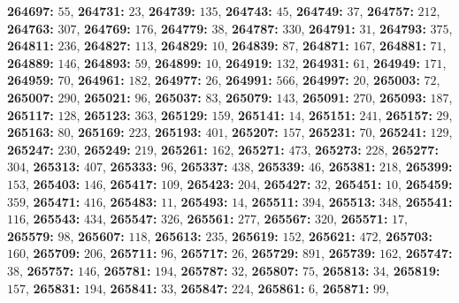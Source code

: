 \textsf{\bfseries 264697:} $55$, \textsf{\bfseries 264731:} $23$, \textsf{\bfseries 264739:} $135$, \textsf{\bfseries 264743:} $45$, \textsf{\bfseries 264749:} $37$, \textsf{\bfseries 264757:} $212$, \textsf{\bfseries 264763:} $307$, \textsf{\bfseries 264769:} $176$, \textsf{\bfseries 264779:} $38$, \textsf{\bfseries 264787:} $330$, \textsf{\bfseries 264791:} $31$, \textsf{\bfseries 264793:} $375$, \textsf{\bfseries 264811:} $236$, \textsf{\bfseries 264827:} $113$, \textsf{\bfseries 264829:} $10$, \textsf{\bfseries 264839:} $87$, \textsf{\bfseries 264871:} $167$, \textsf{\bfseries 264881:} $71$, \textsf{\bfseries 264889:} $146$, \textsf{\bfseries 264893:} $59$, \textsf{\bfseries 264899:} $10$, \textsf{\bfseries 264919:} $132$, \textsf{\bfseries 264931:} $61$, \textsf{\bfseries 264949:} $171$, \textsf{\bfseries 264959:} $70$, \textsf{\bfseries 264961:} $182$, \textsf{\bfseries 264977:} $26$, \textsf{\bfseries 264991:} $566$, \textsf{\bfseries 264997:} $20$, \textsf{\bfseries 265003:} $72$, \textsf{\bfseries 265007:} $290$, \textsf{\bfseries 265021:} $96$, \textsf{\bfseries 265037:} $83$, \textsf{\bfseries 265079:} $143$, \textsf{\bfseries 265091:} $270$, \textsf{\bfseries 265093:} $187$, \textsf{\bfseries 265117:} $128$, \textsf{\bfseries 265123:} $363$, \textsf{\bfseries 265129:} $159$, \textsf{\bfseries 265141:} $14$, \textsf{\bfseries 265151:} $241$, \textsf{\bfseries 265157:} $29$, \textsf{\bfseries 265163:} $80$, \textsf{\bfseries 265169:} $223$, \textsf{\bfseries 265193:} $401$, \textsf{\bfseries 265207:} $157$, \textsf{\bfseries 265231:} $70$, \textsf{\bfseries 265241:} $129$, \textsf{\bfseries 265247:} $230$, \textsf{\bfseries 265249:} $219$, \textsf{\bfseries 265261:} $162$, \textsf{\bfseries 265271:} $473$, \textsf{\bfseries 265273:} $228$, \textsf{\bfseries 265277:} $304$, \textsf{\bfseries 265313:} $407$, \textsf{\bfseries 265333:} $96$, \textsf{\bfseries 265337:} $438$, \textsf{\bfseries 265339:} $46$, \textsf{\bfseries 265381:} $218$, \textsf{\bfseries 265399:} $153$, \textsf{\bfseries 265403:} $146$, \textsf{\bfseries 265417:} $109$, \textsf{\bfseries 265423:} $204$, \textsf{\bfseries 265427:} $32$, \textsf{\bfseries 265451:} $10$, \textsf{\bfseries 265459:} $359$, \textsf{\bfseries 265471:} $416$, \textsf{\bfseries 265483:} $11$, \textsf{\bfseries 265493:} $14$, \textsf{\bfseries 265511:} $394$, \textsf{\bfseries 265513:} $348$, \textsf{\bfseries 265541:} $116$, \textsf{\bfseries 265543:} $434$, \textsf{\bfseries 265547:} $326$, \textsf{\bfseries 265561:} $277$, \textsf{\bfseries 265567:} $320$, \textsf{\bfseries 265571:} $17$, \textsf{\bfseries 265579:} $98$, \textsf{\bfseries 265607:} $118$, \textsf{\bfseries 265613:} $235$, \textsf{\bfseries 265619:} $152$, \textsf{\bfseries 265621:} $472$, \textsf{\bfseries 265703:} $160$, \textsf{\bfseries 265709:} $206$, \textsf{\bfseries 265711:} $96$, \textsf{\bfseries 265717:} $26$, \textsf{\bfseries 265729:} $891$, \textsf{\bfseries 265739:} $162$, \textsf{\bfseries 265747:} $38$, \textsf{\bfseries 265757:} $146$, \textsf{\bfseries 265781:} $194$, \textsf{\bfseries 265787:} $32$, \textsf{\bfseries 265807:} $75$, \textsf{\bfseries 265813:} $34$, \textsf{\bfseries 265819:} $157$, \textsf{\bfseries 265831:} $194$, \textsf{\bfseries 265841:} $33$, \textsf{\bfseries 265847:} $224$, \textsf{\bfseries 265861:} $6$, \textsf{\bfseries 265871:} $99$, 
